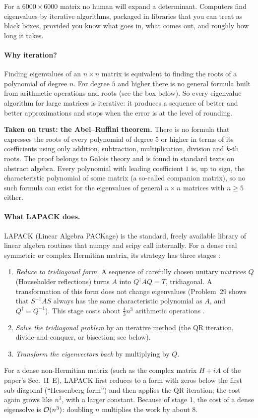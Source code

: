 For a $6000\times6000$ matrix no human will expand a determinant. Computers find eigenvalues by iterative algorithms, packaged in libraries that you can treat as black boxes, provided you know what goes in, what comes out, and roughly how long it takes.

\paragraph{Why iteration?} Finding eigenvalues of an $n\times n$ matrix is equivalent to finding the roots of a polynomial of degree $n$. For degree $5$ and higher there is no general formula built from arithmetic operations and roots (see the box below). So every eigenvalue algorithm for large matrices is iterative: it produces a sequence of better and better approximations and stops when the error is at the level of rounding.

\begin{beyond}
\textbf{Taken on trust: the Abel--Ruffini theorem.} There is no formula that expresses the roots of every polynomial of degree $5$ or higher in terms of its coefficients using only addition, subtraction, multiplication, division and $k$-th roots. The proof belongs to Galois theory and is found in standard texts on abstract algebra. Every polynomial with leading coefficient $1$ is, up to sign, the characteristic polynomial of some matrix (a so-called companion matrix), so no such formula can exist for the eigenvalues of general $n\times n$ matrices with $n\ge5$ either.
\end{beyond}

\paragraph{What LAPACK does.} LAPACK (Linear Algebra PACKage) is the standard, freely available library of linear algebra routines that numpy and scipy call internally. For a dense real symmetric or complex Hermitian matrix, its strategy has three stages \cite{trefethen}:
\begin{enumerate}
\item \emph{Reduce to tridiagonal form.} A sequence of carefully chosen unitary matrices $Q$ (Householder reflections) turns $A$ into $Q^\dagger AQ=T$, tridiagonal. A transformation of this form does not change eigenvalues (Problem~29 shows that $S^{-1}AS$ always has the same characteristic polynomial as $A$, and $Q^\dagger=Q^{-1}$). This stage costs about $\tfrac43n^3$ arithmetic operations \cite{trefethen}.
\item \emph{Solve the tridiagonal problem} by an iterative method (the QR iteration, divide-and-conquer, or bisection; see below).
\item \emph{Transform the eigenvectors back} by multiplying by $Q$.
\end{enumerate}
For a dense non-Hermitian matrix (such as the complex matrix $H+iA$ of the paper's Sec.~II~E), LAPACK first reduces to a form with zeros below the first sub-diagonal (``Hessenberg form'') and then applies the QR iteration; the cost again grows like $n^3$, with a larger constant. Because of stage 1, the cost of a dense eigensolve is $\mathcal{O}(n^3)$: doubling $n$ multiplies the work by about $8$.

